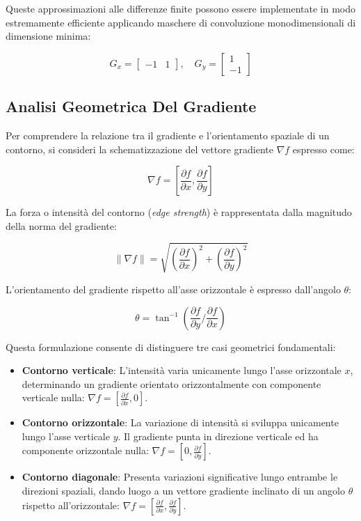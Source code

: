 ﻿\documentclass[11pt, a4paper]{article}
\begin{document}
Queste approssimazioni alle differenze finite possono essere implementate in modo estremamente efficiente applicando maschere di convoluzione monodimensionali di dimensione minima:

\[ G_x = \begin{bmatrix} -1 & 1 \end{bmatrix}, \quad G_y = \begin{bmatrix} 1 \\ -1 \end{bmatrix} \]


\subsection{Analisi Geometrica Del Gradiente}

Per comprendere la relazione tra il gradiente e l'orientamento spaziale di un contorno, si consideri la schematizzazione del vettore gradiente $\nabla f$ espresso come:

\[ \nabla f = \left[ \frac{\partial f}{\partial x}, \frac{\partial f}{\partial y} \right] \]

La forza o intensità del contorno (\emph{edge strength}) è rappresentata dalla magnitudo della norma del gradiente:

\[ \|\nabla f\| = \sqrt{\left(\frac{\partial f}{\partial x}\right)^2 + \left(\frac{\partial f}{\partial y}\right)^2} \]

L'orientamento del gradiente rispetto all'asse orizzontale è espresso dall'angolo $\theta$:

\[ \theta = \tan^{-1}\left( \frac{\partial f}{\partial y} \Big/ \frac{\partial f}{\partial x} \right) \]

Questa formulazione consente di distinguere tre casi geometrici fondamentali:
\begin{itemize}
    \item \textbf{Contorno verticale}: L'intensità varia unicamente lungo l'asse orizzontale $x$, determinando un gradiente orientato orizzontalmente con componente verticale nulla: $\nabla f = \left[ \frac{\partial f}{\partial x}, 0 \right]$.
    \item \textbf{Contorno orizzontale}: La variazione di intensità si sviluppa unicamente lungo l'asse verticale $y$. Il gradiente punta in direzione verticale ed ha componente orizzontale nulla: $\nabla f = \left[ 0, \frac{\partial f}{\partial y} \right]$.
    \item \textbf{Contorno diagonale}: Presenta variazioni significative lungo entrambe le direzioni spaziali, dando luogo a un vettore gradiente inclinato di un angolo $\theta$ rispetto all'orizzontale: $\nabla f = \left[ \frac{\partial f}{\partial x}, \frac{\partial f}{\partial y} \right]$.
\end{itemize}
\end{document}
